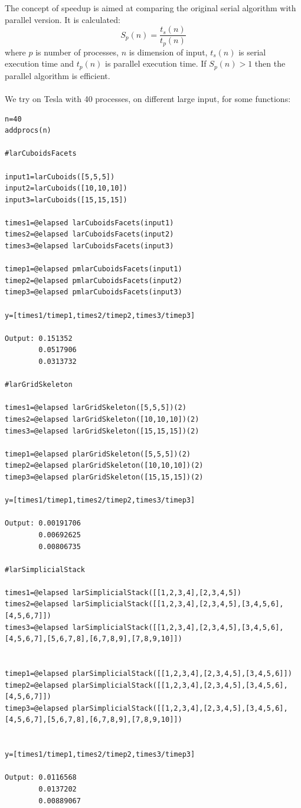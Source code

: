 \documentclass{article}
\begin{document}
The concept of speedup is aimed at comparing the original serial algorithm with parallel version.
It is calculated:
\[S_p(n)=\frac{t_s(n)}{t_p(n)}\]
where $p$ is number of processes, $n$ is dimension of input, $t_s(n)$ is serial execution time and $t_p(n)$ is parallel execution time.
If $S_p(n) > 1$ then the parallel algorithm is efficient.
\\
\\
We try on Tesla with 40 processes, on different large input, for some functions:
\begin{flushleft}\small
\begin{list}{}{} \item
  \begin{Verbatim}[tabsize=4]
n=40
addprocs(n)

#larCuboidsFacets

input1=larCuboids([5,5,5])
input2=larCuboids([10,10,10])
input3=larCuboids([15,15,15])

times1=@elapsed larCuboidsFacets(input1)
times2=@elapsed larCuboidsFacets(input2)
times3=@elapsed larCuboidsFacets(input3)

timep1=@elapsed pmlarCuboidsFacets(input1)
timep2=@elapsed pmlarCuboidsFacets(input2)
timep3=@elapsed pmlarCuboidsFacets(input3)

y=[times1/timep1,times2/timep2,times3/timep3]

Output: 0.151352
        0.0517906
        0.0313732

#larGridSkeleton

times1=@elapsed larGridSkeleton([5,5,5])(2)
times2=@elapsed larGridSkeleton([10,10,10])(2)
times3=@elapsed larGridSkeleton([15,15,15])(2)

timep1=@elapsed plarGridSkeleton([5,5,5])(2)
timep2=@elapsed plarGridSkeleton([10,10,10])(2)
timep3=@elapsed plarGridSkeleton([15,15,15])(2)

y=[times1/timep1,times2/timep2,times3/timep3]

Output: 0.00191706
        0.00692625
        0.00806735

#larSimplicialStack

times1=@elapsed larSimplicialStack([[1,2,3,4],[2,3,4,5])
times2=@elapsed larSimplicialStack([[1,2,3,4],[2,3,4,5],[3,4,5,6],[4,5,6,7]])
times3=@elapsed larSimplicialStack([[1,2,3,4],[2,3,4,5],[3,4,5,6],[4,5,6,7],[5,6,7,8],[6,7,8,9],[7,8,9,10]])


timep1=@elapsed plarSimplicialStack([[1,2,3,4],[2,3,4,5],[3,4,5,6]])
timep2=@elapsed plarSimplicialStack([[1,2,3,4],[2,3,4,5],[3,4,5,6],[4,5,6,7]])
timep3=@elapsed plarSimplicialStack([[1,2,3,4],[2,3,4,5],[3,4,5,6],[4,5,6,7],[5,6,7,8],[6,7,8,9],[7,8,9,10]])


y=[times1/timep1,times2/timep2,times3/timep3]

Output: 0.0116568
        0.0137202   
        0.00889067
\end{Verbatim}
\end{list}
\end{flushleft}   
\end{document}
